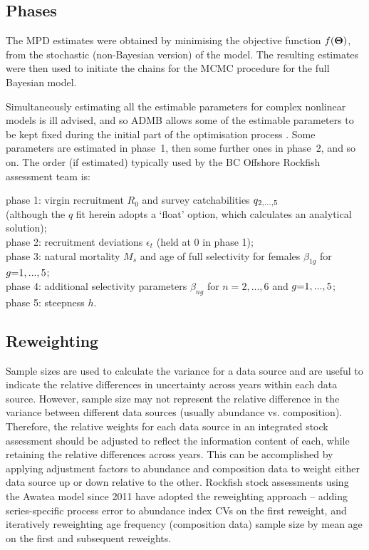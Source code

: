 \documentclass[11pt]{book}
\def\bfTh{{\bf \Theta}}%
\def\bfTh{{\bf \Theta}}          %
\def\hsd{\hspace*{1ex}}
\begin{document}
\subsection{Phases}

The MPD estimates were obtained by minimising the objective function $f(\bfTh)$, from the stochastic (non-Bayesian version) of the model. 
The resulting estimates were then used to initiate the chains for the MCMC procedure for the full Bayesian model.

Simultaneously estimating all the estimable parameters for complex nonlinear models is ill advised, and so ADMB allows some of the estimable parameters to be kept fixed during the initial part of the optimisation process \citet{ADMB:2009}. 
Some parameters are estimated in phase~1, then some further ones in phase~2, and so on. 
The order (if estimated) typically used by the BC Offshore Rockfish assessment team is:

\begin{changemargin}{0.25in}{0.25in}{0.5ex}
phase 1: virgin recruitment $R_0$ and survey catchabilities $q_{2,...,5}$\\
  \hsd (although the $q$ fit herein adopts a `float' option, which calculates an analytical solution);\\
phase 2: recruitment deviations $\epsilon_t$ (held at 0 in phase 1);\\
phase 3: natural mortality $M_{s}$ and age of full selectivity for females $\beta_{1g}$ for $g{=}1,...,5$;\\
phase 4: additional selectivity parameters $\beta_{ng}$ for $n{=}2,...,6$ and $g{=}1,...,5$;\\
phase 5: steepness $h$.
\end{changemargin}

\subsection{Reweighting} \label{ss:reweight}

Sample sizes are used to calculate the variance for a data source and are useful to indicate the relative differences in uncertainty across years within each data source.
However, sample size may not represent the relative difference in the variance between different data sources (usually abundance vs. composition).
Therefore, the relative weights for each data source in an integrated stock assessment should be adjusted to reflect the information content of each, while retaining the relative differences across years.
This can be accomplished by applying adjustment factors to abundance and composition data to weight either data source up or down relative to the other.
Rockfish stock assessments using the Awatea model since 2011 have adopted the \citet{Francis:2011} reweighting approach -- adding series-specific process error to abundance index CVs on the first reweight, and iteratively reweighting age frequency (composition data) sample size by mean age on the first and subsequent reweights.
\end{document}
